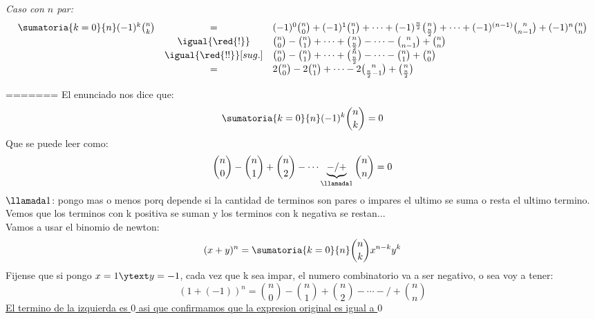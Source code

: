 \begin{enumerate}[label=\alph*)]
\begin{enumerate}[label=\roman*)]
        \textit{Caso con $n$ par:}
        $$
          \begin{array}{rcl}
            \sumatoria{k = 0}{n} (-1)^k \binom{n}{k}
             & =                      &
            (-1)^0  \binom{n}{0} +
            (-1)^1  \binom{n}{1} +
            \cdots +
            (-1)^{\frac{n}{2}} \binom{n}{\frac{n}{2}} +
            \cdots +
            (-1)^{(n-1)} \binom{n}{n-1} +
            (-1)^n  \binom{n}{n}        \\
             & \igual{\red{!}}        &
            \binom{n}{0} -
            \binom{n}{1} +
            \cdots +
            \binom{n}{\frac{n}{2}} -
            \cdots -
            \binom{n}{n-1} +
            \binom{n}{n}                \\
             & \igual{\red{!!}}[sug.] &
            \binom{n}{0} -
            \binom{n}{1} +
            \cdots +
            \binom{n}{\frac{n}{2}} -
            \cdots -
            \binom{n}{1} +
            \binom{n}{0}                \\
             & =                      &
            2\binom{n}{0} -
            2\binom{n}{1} +
            \cdots -
            2\binom{n}{\frac{n}{2}-1} +
            \binom{n}{\frac{n}{2}}
          \end{array}
        $$


        \hacer

=======
        El enunciado nos dice que:
        \[
        \sumatoria{k = 0}{n} (-1)^k \binom{n}{k} = 0
        \]
        Que se puede leer como:
        \[
        \binom{n}{0} -\binom{n}{1} + \binom{n}{2} - \cdots \underbrace{-\slash+}_{\llamada1} \binom{n}{n} = 0 \\
        \]
        $\llamada1$: pongo mas o menos porq depende si la cantidad de terminos son pares o impares 
        el ultimo se suma o resta el ultimo termino. \\
        Vemos que los terminos con k positiva se suman y los terminos con k negativa se restan... \\

        Vamos a usar el binomio de newton:
        \[
        (x + y)^n = \sumatoria{k=0}{n} \binom{n}{k} x^{n-k} y^{k}
        \]
        Fijense que si pongo $x = 1 \ytext y = -1$, cada vez que k sea impar, el numero combinatorio va a ser negativo, o sea
        voy a tener:
        \[
        (1 + (-1))^n = \binom{n}{0} -\binom{n}{1} + \binom{n}{2} - \cdots -\slash+ \binom{n}{n}
        \]
        \underline{El termino de la izquierda es $0$ asi que confirmamos que la expresion original es igual a $0$}


\end{enumerate}
\end{enumerate}
